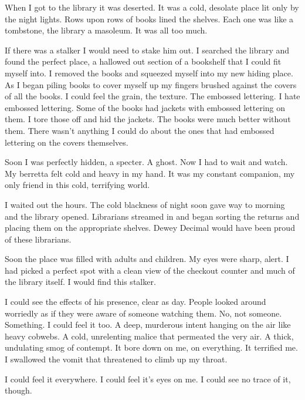 When I got to the library it was deserted. It was a cold, desolate
place lit only by the night lights. Rows upon rows of books lined
the shelves. Each one was like a tombstone, the library a masoleum.
It was all too much.



If there was a stalker I would need to stake him out. I searched
the library and found the perfect place, a hallowed out section of
a bookshelf that I could fit myself into. I removed the books and
squeezed myself into my new hiding place. As I began piling books
to cover myself up my fingers brushed against the covers of all the
books. I could feel the grain, the texture. The embossed lettering.
I hate embossed lettering. Some of the books had jackets with
embossed lettering on them. I tore those off and hid the jackets.
The books were much better without them. There wasn't anything I
could do about the ones that had embossed lettering on the covers
themselves.



Soon I was perfectly hidden, a specter. A ghost. Now I had to wait
and watch. My berretta felt cold and heavy in my hand. It was my
constant companion, my only friend in this cold, terrifying
world.



I waited out the hours. The cold blackness of night soon gave way
to morning and the library opened. Librarians streamed in and began
sorting the returns and placing them on the appropriate shelves.
Dewey Decimal would have been proud of these librarians.



Soon the place was filled with adults and children. My eyes were
sharp, alert. I had picked a perfect spot with a clean view of the
checkout counter and much of the library itself. I would find this
stalker.



I could see the effects of his presence, clear as day. People
looked around worriedly as if they were aware of someone watching
them. No, not someone. Something. I could feel it too. A deep,
murderous intent hanging on the air like heavy cobwebs. A cold,
unrelenting malice that permeated the very air. A thick, undulating
smog of contempt. It bore down on me, on everything. It terrified
me. I swallowed the vomit that threatened to climb up my
throat.



I could feel it everywhere. I could feel it's eyes on me. I could
see no trace of it, though.



